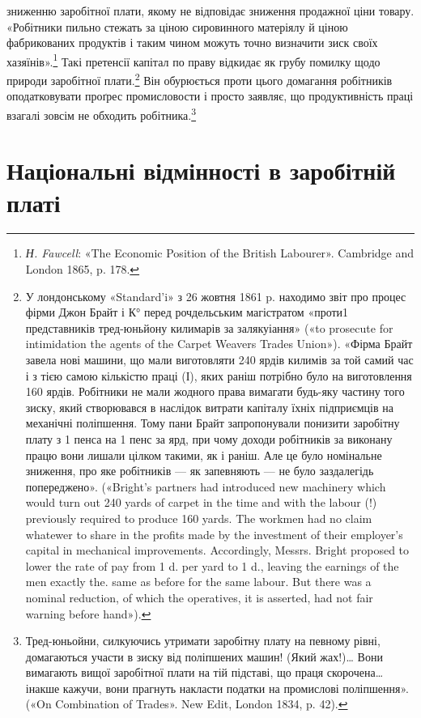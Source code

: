 зниженню заробітної плати, якому не відповідає зниження продажної
ціни товару. «Робітники пильно стежать за ціною сировинного
матеріялу й ціною фабрикованих продуктів і таким чином
можуть точно визначити зиск своїх хазяїнів».\footnote{
\emph{Н. Fawcell}: «The Economic Position of the British Labourer».
Cambridge and London 1865, p. 178.
} Такі претенсії
капітал по праву відкидає як грубу помилку щодо природи
заробітної плати.\footnote{
У лондонському «Standard’i» з 26 жовтня 1861 p. находимо звіт
про процес фірми Джон Брайт і К° перед рочдельським магістратом
«проти1 представників тред-юньйону килимарів за залякуіання»
(«to prosecute for intimidation the agents of the Carpet Weavers Trades
Union»). «Фірма Брайт завела нові машини, що мали виготовляти 240 ярдів
килимів за той самий час і з тією самою кількістю праці (І), яких
раніш потрібно було на виготовлення 160 ярдів. Робітники не мали жодного
права вимагати будь-яку частину того зиску, який створювався в наслідок
витрати капіталу їхніх підприємців на механічні поліпшення. Тому
пани Брайт запропонували понизити заробітну плату з 1 пенса на
1 пенс за ярд, при чому доходи робітників за виконану працю вони лишали
цілком такими, як і раніш. Але це було номінальне зниження, про яке
робітників — як запевняють — не було заздалегідь попереджено». («Bright’s
partners had introduced new machinery which would turn out 240 yards
of carpet in the time and with the labour (!) previously required to produce
160 yards. The workmen had no claim whatewer to share in the profits
made by the investment of their employer’s capital in mechanical improvements.
Accordingly, Messrs. Bright proposed to lower the rate of pay from
1 d. per yard to 1 d., leaving the earnings of the men exactly the. same
as before for the same labour. But there was a nominal reduction, of which
the operatives, it is asserted, had not fair warning before hand»).
} Він обурюється проти цього домагання робітників
оподатковувати проґрес промисловости і просто заявляє,
що продуктивність праці взагалі зовсім не обходить робітника.\footnote{
Тред-юньойни, силкуючись утримати заробітну плату на певному
рівні, домагаються участи в зиску від поліпшених машин! (Який
жах!)\dots{} Вони вимагають вищої заробітної плати на тій підставі, що праця
скорочена\dots{} інакше кажучи, вони прагнуть накласти податки на промислові
поліпшення». («On Combination of Trades». New Edit, London
1834, p. 42).
}

\section{Національні відмінності в заробітній платі}

